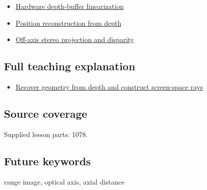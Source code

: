 \begin{itemize}
\tightlist
\item
  \hyperref[appendix-1bc40b08db4a]{Hardware depth-buffer linearization}
\item
  \hyperref[appendix-2cbf2968e866]{Position reconstruction from depth}
\item
  \hyperref[appendix-0976e86e5b9f]{Off-axis stereo projection and disparity}
\end{itemize}

\subsection{Full teaching explanation}\label{appendix-cac01ebeeb11-full-teaching-explanation}

\begin{itemize}
\tightlist
\item
  \hyperref[02-foundations-ii-ch035-recover-geometry-from-depth-and-construct-screen-space-rays]{Recover geometry from depth and construct screen-space rays}
\end{itemize}

\subsection{Source coverage}\label{appendix-cac01ebeeb11-source-coverage}

Supplied lesson parts: 1078.

\subsection{Future keywords}\label{appendix-cac01ebeeb11-future-keywords}

range image, optical axis, axial distance
